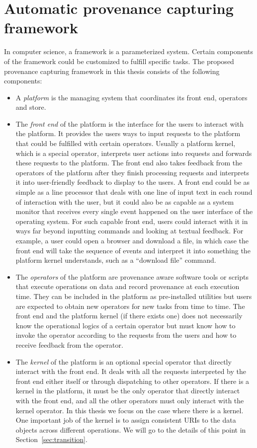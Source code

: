 \section{Automatic provenance capturing framework}
In computer science, a framework is a parameterized system. Certain components of the framework could be customized to fulfill specific tasks. The proposed provenance capturing framework in this thesis consists of the following components:
\begin{itemize}
	\item A \emph{platform} is the managing system that coordinates its front end, operators and store.
	\item The \emph{front end} of the platform is the interface for the users to interact with the platform. It provides the users ways to input requests to the platform that could be fulfilled with certain operators. Usually a platform kernel, which is a special operator, interprets user actions into requests and forwards these requests to the platform. The front end also takes feedback from the operators of the platform after they finish processing requests and interprets it into user-friendly feedback to display to the users. A front end could be as simple as a line processor that deals with one line of input text in each round of interaction with the user, but it could also be as capable as a system monitor that receives every single event happened on the user interface of the operating system. For such capable front end, users could interact with it in ways far beyond inputting commands and looking at textual feedback. For example, a user could open a browser and download a file, in which case the front end will take the sequence of events and interpret it into something the platform kernel understands, such as a ``download file'' command.
	\item The \emph{operators} of the platform are provenance aware software tools or scripts that execute operations on data and record provenance at each execution time. They can be included in the platform as pre-installed utilities but users are expected to obtain new operators for new tasks from time to time. The front end and the platform kernel (if there exists one) does not necessarily know the operational logics of a certain operator but must know how to invoke the operator according to the requests from the users and how to receive feedback from the operator.
	\item The \emph{kernel} of the platform is an optional special operator that directly interact with the front end. It deals with all the requests interpreted by the front end either itself or through dispatching to other operators. If there is a kernel in the platform, it must be the only operator that directly interact with the front end, and all the other operators must only interact with the kernel operator. In this thesis we focus on the case where there is a kernel. One important job of the kernel is to assign consistent URIs to the data objects across different operations. We will go to the details of this point in Section~\ref{sec:transition}.

\end{itemize}
